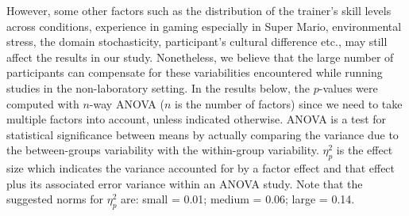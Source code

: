 However, some other factors such as the distribution of the trainer's skill levels across conditions, experience in gaming especially in Super Mario, environmental stress, the domain stochasticity, participant's cultural difference etc., may still affect the results in our study. Nonetheless, we believe that the large number of participants can compensate for these variabilities encountered while running studies in the non-laboratory setting.
In the results below, the $p$-values were computed with $n$-way ANOVA ($n$ is the number of factors) since we need to take multiple factors into account, unless indicated otherwise. ANOVA is a test for statistical significance between means by actually comparing the variance due to the between-groups variability with the within-group variability. %
$\eta_{p}^{2}$ is the effect size which indicates %
the variance accounted for by a factor effect and that effect plus its associated error variance within an ANOVA study. Note that the suggested norms for $\eta_{p}^{2}$ are: small = 0.01; medium = 0.06; large = 0.14.  %


